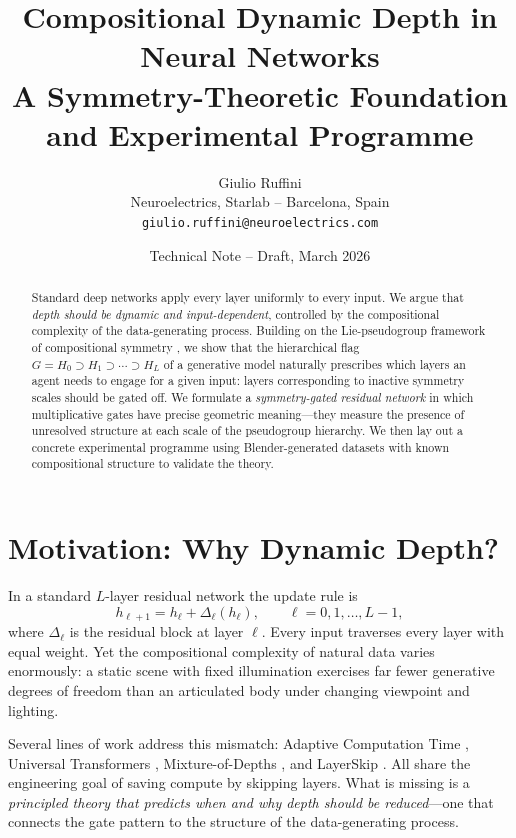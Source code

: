 \documentclass[11pt,a4paper]{article}
\title{\textbf{Compositional Dynamic Depth in Neural Networks}\\[4pt]
\large A Symmetry-Theoretic Foundation and Experimental Programme}
\author{Giulio Ruffini\\
\small Neuroelectrics, Starlab -- Barcelona, Spain\\
\small\texttt{giulio.ruffini@neuroelectrics.com}}
\date{Technical Note -- Draft, March 2026}
\begin{document}
\maketitle

\begin{abstract}
Standard deep networks apply every layer uniformly to every input.
We argue that \emph{depth should be dynamic and input-dependent},
controlled by the compositional complexity of the data-generating process.
Building on the Lie-pseudogroup framework of compositional symmetry
\citep{Ruffini2025entropy,Ruffini2025compositional},
we show that the hierarchical flag
$G=H_0\supset H_1\supset\cdots\supset H_L$
of a generative model naturally prescribes which layers
an agent needs to engage for a given input:
layers corresponding to inactive symmetry scales should be gated off.
We formulate a \emph{symmetry-gated residual network} in which
multiplicative gates have precise geometric meaning---they measure the
presence of unresolved structure at each scale of the pseudogroup
hierarchy.
We then lay out a concrete experimental programme using
Blender-generated datasets with known compositional structure
to validate the theory.
\end{abstract}

\section{Motivation: Why Dynamic Depth?}\label{sec:motivation}

In a standard $L$-layer residual network the update rule is
\begin{equation}\label{eq:resnet}
  h_{\ell+1} = h_\ell + \Delta_\ell(h_\ell),
  \qquad \ell = 0,1,\ldots,L-1,
\end{equation}
where $\Delta_\ell$ is the residual block at layer $\ell$.
Every input traverses every layer with equal weight.
Yet the compositional complexity of natural data varies enormously:
a static scene with fixed illumination exercises far fewer
generative degrees of freedom than an articulated body
under changing viewpoint and lighting.

Several lines of work address this mismatch:
Adaptive Computation Time \citep{Graves2016},
Universal Transformers \citep{Dehghani2019},
Mixture-of-Depths \citep{Raposo2024},
and LayerSkip \citep{Elhoushi2024}.
All share the engineering goal of saving compute by skipping layers.
What is missing is a \emph{principled theory that predicts
when and why depth should be reduced}---one that connects
the gate pattern to the structure of the data-generating process.
\end{document}
